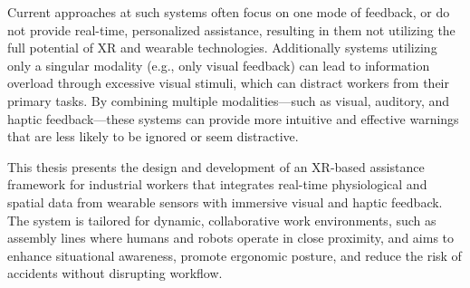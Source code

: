Current approaches at such systems often focus on one mode of feedback, or do not provide real-time, personalized assistance, resulting in them not utilizing the full potential of XR and wearable technologies. Additionally systems utilizing only a singular modality (e.g., only visual feedback) can lead to information overload through excessive visual stimuli, which can distract workers from their primary tasks. By combining multiple modalities—such as visual, auditory, and haptic feedback—these systems can provide more intuitive and effective warnings that are less likely to be ignored or seem distractive.

This thesis presents the design and development of an XR-based assistance framework for industrial workers that integrates real-time physiological and spatial data from wearable sensors with immersive visual and haptic feedback. The system is tailored for dynamic, collaborative work environments, such as assembly lines where humans and robots operate in close proximity, and aims to enhance situational awareness, promote ergonomic posture, and reduce the risk of accidents without disrupting workflow.

